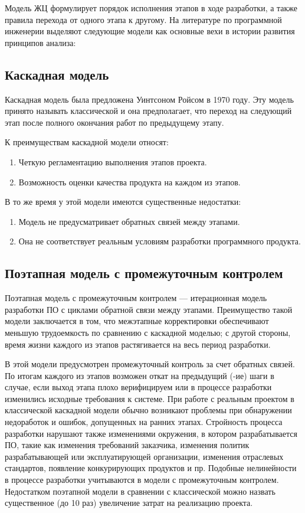 Модель ЖЦ формулирует порядок исполнения этапов в ходе разработки, а также правила перехода от одного этапа к другому. На литературе по программной инженерии выделяют следующие модели как основные вехи в истории развития принципов анализа:

\subsection{Каскадная модель}

Каскадная модель была предложена Уинтсоном Ройсом в 1970 году. Эту модель принято называть классической и она предполагает, что  переход на следующий этап после полного окончания работ по предыдущему этапу.

К преимуществам каскадной модели относят:

\begin{enumerate}
	\item{Четкую регламентацию выполнения этапов проекта.}
	\item{Возможность оценки качества продукта на каждом из этапов.}
\end{enumerate} 

В то же время у этой модели имеются существенные недостатки:

\begin{enumerate}
	\item{Модель не предусматривает  обратных связей между этапами.}
	\item{Она не соответствует реальным условиям разработки программного продукта.}
\end{enumerate} 

\subsection{Поэтапная модель с промежуточным контролем}

Поэтапная модель с промежуточным контролем --- итерационная модель разработки ПО с циклами обратной связи между этапами. Преимущество такой модели заключается в том, что межэтапные корректировки обеспечивают меньшую трудоемкость по сравнению с каскадной моделью; с другой стороны, время жизни каждого из этапов растягивается на весь период разработки.

В этой модели предусмотрен промежуточный контроль за счет обратных связей. По итогам каждого из этапов возможен откат на предыдущий (-ие) шаги в случае, если выход этапа плохо верифицируем или в процессе разработки изменились исходные требования к системе.  При работе с реальным проектом в классической каскадной модели обычно возникают проблемы при обнаружении недоработок и ошибок, допущенных на ранних этапах. Стройность процесса разработки нарушают также изменениями окружения, в котором разрабатывается ПО, такие как изменения требований заказчика, изменения политик разрабатывающей или эксплуатирующей организации, изменения отраслевых стандартов, появление конкурирующих продуктов и пр. Подобные нелинейности в процессе разработки учитываются в модели с промежуточным контролем. Недостатком поэтапной модели в сравнении с классической можно назвать существенное (до 10 раз) увеличение затрат на реализацию проекта.

